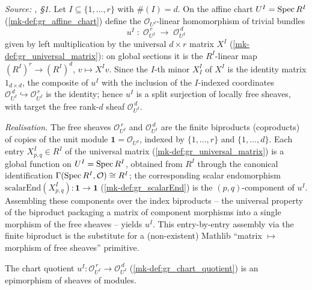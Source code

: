 \begin{definition}\label{mk-def:gr_chart_quotient}
  \leanok

  \textit{Source: \cite{nitsure-hilbert-quot}, \S 1.}
  Let \(I \subseteq \{1,\dots,r\}\) with \(\#(I) = d\). On the affine chart
  \(U^I = \operatorname{Spec} R^I\) (\ref{mk-def:gr_affine_chart}) define the
  \(\mathcal{O}_{U^I}\)-linear homomorphism of trivial bundles
  \[
    u^I \;:\; \mathcal{O}_{U^I}^{\,r}
      \;\longrightarrow\; \mathcal{O}_{U^I}^{\,d}
  \]
  given by left multiplication by the universal \(d \times r\) matrix \(X^I\)
  (\ref{mk-def:gr_universal_matrix}): on global sections it is the \(R^I\)-linear
  map \((R^I)^{r} \to (R^I)^{d}\), \(v \mapsto X^I v\). Since the \(I\)-th minor
  \(X^I_I\) of \(X^I\) is the identity matrix \(1_{d \times d}\), the composite of
  \(u^I\) with the inclusion of the \(I\)-indexed coordinates
  \(\mathcal{O}_{U^I}^{\,d} \hookrightarrow \mathcal{O}_{U^I}^{\,r}\) is the
  identity; hence \(u^I\) is a split surjection of locally free sheaves, with
  target the free rank-\(d\) sheaf \(\mathcal{O}_{U^I}^{\,d}\).

  \emph{Realisation.} The free sheaves \(\mathcal{O}_{U^I}^{\,r}\) and
  \(\mathcal{O}_{U^I}^{\,d}\) are the finite biproducts (coproducts) of copies of
  the unit module \(\mathbf{1} = \mathcal{O}_{U^I}\), indexed by \(\{1,\dots,r\}\)
  and \(\{1,\dots,d\}\). Each entry \(X^I_{p,q} \in R^I\) of the universal matrix
  (\ref{mk-def:gr_universal_matrix}) is a global function on \(U^I = \operatorname{Spec} R^I\),
  obtained from \(R^I\) through the canonical identification
  \(\Gamma(\operatorname{Spec} R^I, \mathcal{O}) \cong R^I\); the corresponding scalar
  endomorphism \(\mathrm{scalarEnd}(X^I_{p,q}) : \mathbf{1} \to \mathbf{1}\)
  (\ref{mk-def:gr_scalarEnd}) is the \((p,q)\)-component of \(u^I\). Assembling these
  components over the index biproducts -- the universal property of the biproduct
  packaging a matrix of component morphisms into a single morphism of the free
  sheaves -- yields \(u^I\). This entry-by-entry assembly via the finite biproduct
  is the substitute for a (non-existent) Mathlib ``matrix \(\mapsto\) morphism of
  free sheaves'' primitive.
\end{definition}


\begin{lemma}\label{mk-lem:gr_chartQuotientMap_epi}
  \leanok

  The chart quotient \(u^I : \mathcal{O}_{U^I}^{\,r} \to \mathcal{O}_{U^I}^{\,d}\)
  (\ref{mk-def:gr_chart_quotient}) is an epimorphism of sheaves of modules.
\end{lemma}

